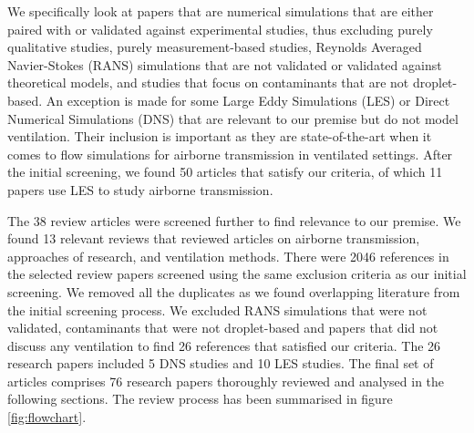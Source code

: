 \documentclass[preprint,12pt]{elsarticle}
\begin{document}
We specifically look at papers that are numerical simulations that are either paired with or validated against experimental studies, thus excluding purely qualitative studies, purely measurement-based studies, Reynolds Averaged Navier-Stokes (RANS) simulations that are not validated or validated against theoretical models, and studies that focus on contaminants that are not droplet-based. An exception is made for some Large Eddy Simulations (LES) or Direct Numerical Simulations (DNS) that are relevant to our premise but do not model ventilation. Their inclusion is important as they are state-of-the-art when it comes to flow simulations for airborne transmission in ventilated settings. After the initial screening, we found 50 articles that satisfy our criteria, of which 11 papers use LES to study airborne transmission. 

The 38 review articles were screened further to find relevance to our premise. We found 13 relevant reviews that reviewed articles on airborne transmission, approaches of research, and ventilation methods. There were 2046 references in the selected review papers screened using the same exclusion criteria as our initial screening. We removed all the duplicates as we found overlapping literature from the initial screening process. We excluded RANS simulations that were not validated, contaminants that were not droplet-based and papers that did not discuss any ventilation to find 26 references that satisfied our criteria. The 26 research papers included 5 DNS studies and 10 LES studies. The final set of articles comprises 76 research papers thoroughly reviewed and analysed in the following sections. The review process has been summarised in figure \ref{fig:flowchart}.
\end{document}
